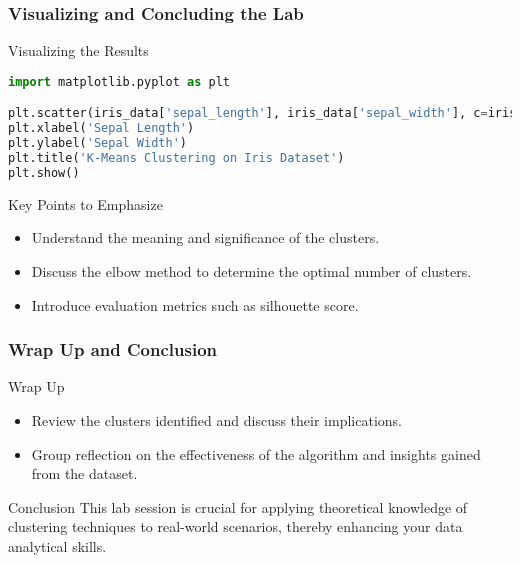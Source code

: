 \documentclass[aspectratio=169]{beamer}
\begin{document}
\begin{frame}[fragile]
    \frametitle{Visualizing and Concluding the Lab}
    \begin{block}{Visualizing the Results}
        \begin{lstlisting}[language=Python]
import matplotlib.pyplot as plt

plt.scatter(iris_data['sepal_length'], iris_data['sepal_width'], c=iris_data['cluster'])
plt.xlabel('Sepal Length')
plt.ylabel('Sepal Width')
plt.title('K-Means Clustering on Iris Dataset')
plt.show()
        \end{lstlisting}
    \end{block}

    \begin{block}{Key Points to Emphasize}
        \begin{itemize}
            \item Understand the meaning and significance of the clusters.
            \item Discuss the elbow method to determine the optimal number of clusters.
            \item Introduce evaluation metrics such as silhouette score.
        \end{itemize}
    \end{block}
\end{frame}

\begin{frame}[fragile]
    \frametitle{Wrap Up and Conclusion}
    \begin{block}{Wrap Up}
        \begin{itemize}
            \item Review the clusters identified and discuss their implications.
            \item Group reflection on the effectiveness of the algorithm and insights gained from the dataset.
        \end{itemize}
    \end{block}

    \begin{block}{Conclusion}
        This lab session is crucial for applying theoretical knowledge of clustering techniques to real-world scenarios, thereby enhancing your data analytical skills.
    \end{block}
\end{frame}
\end{document}

